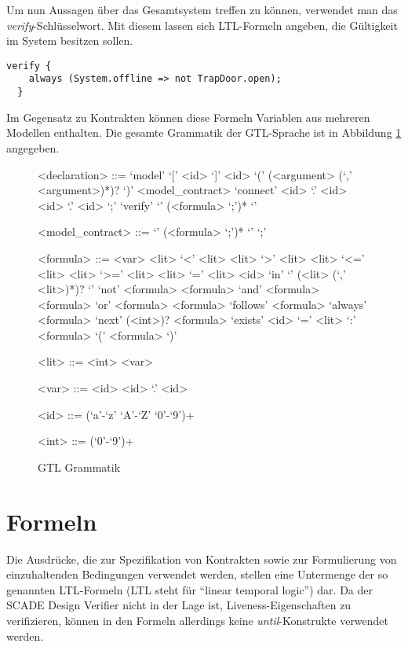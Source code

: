 Um nun Aussagen über das Gesamtsystem treffen zu können, verwendet man das \emph{verify}-Schlüsselwort.
Mit diesem lassen sich LTL-Formeln angeben, die Gültigkeit im System besitzen sollen.
\begin{lstlisting}[language=gtl]
  verify {
    always (System.offline => not TrapDoor.open);
  }
\end{lstlisting}
Im Gegensatz zu Kontrakten können diese Formeln Variablen aus mehreren Modellen enthalten.
Die gesamte Grammatik der GTL-Sprache ist in Abbildung \ref{fig:grammar} angegeben.

\begin{figure}
  \centering
  \begin{grammar}
    <declaration> ::= `model' `[' <id> `]' <id> `(' (<argument> (`,' <argument>)*)? `)' <model\_contract>
    \alt `connect' <id> `.' <id> <id> `.' <id> `;'
    \alt `verify' `{' (<formula> `;')* `}'
    
    <model\_contract> ::= `{' (<formula> `;')* `}'
    \alt `;'
    
    <formula> ::= <var>
    \alt <lit> `<' <lit>
    \alt <lit> `>' <lit>
    \alt <lit> `<=' <lit>
    \alt <lit> `>=' <lit>
    \alt <lit> `=' <lit>
    \alt <id> `in' `{' (<lit> (`,' <lit>)*)? `}'
    \alt `not' <formula>
    \alt <formula> `and' <formula>
    \alt <formula> `or' <formula>
    \alt <formula> `follows' <formula>
    \alt `always' <formula>
    \alt `next' (<int>)? <formula>
    \alt `exists' <id> `=' <lit> `:' <formula>
    \alt `(' <formula> `)'
    
    <lit> ::= <int>
    \alt <var>
    
    <var> ::= <id>
    \alt <id> `.' <id>

    <id> ::= (`a'-`z' `A'-`Z' `0'-`9')+
    
    <int> ::= (`0'-`9')+
  \end{grammar}
  \caption{GTL Grammatik}
  \label{fig:grammar}
\end{figure}

\section{Formeln}
Die Ausdrücke, die zur Spezifikation von Kontrakten sowie zur Formulierung von einzuhaltenden Bedingungen verwendet werden, stellen eine Untermenge der so genannten LTL-Formeln (LTL steht für "`linear temporal logic"') dar.
Da der SCADE Design Verifier nicht in der Lage ist, Liveness-Eigenschaften zu verifizieren, können in den Formeln allerdings keine \emph{until}-Konstrukte verwendet werden.


